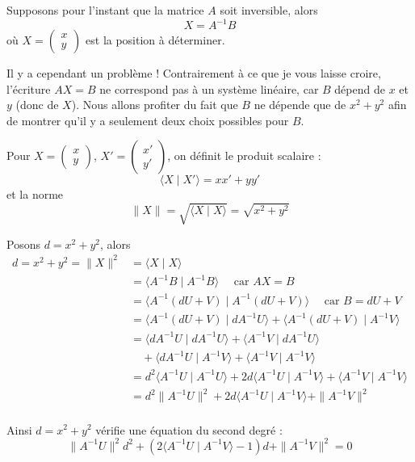 \documentclass[class=report,crop=false]{standalone}
\begin{document}
Supposons pour l'instant que la matrice $A$ soit inversible, 
alors 
$$X = A^{-1} B$$
où $X = \begin{pmatrix}x\\y\end{pmatrix}$ est la position à déterminer.

Il y a cependant un problème ! Contrairement à ce que je vous laisse croire,
l'écriture $AX=B$ ne correspond pas à un système linéaire, car
$B$ dépend de $x$ et $y$ (donc de $X$). Nous allons profiter du fait que $B$ ne dépende que de 
$x^2+y^2$ afin de montrer qu'il y a seulement deux choix possibles pour $B$.

Pour $X = \begin{pmatrix}x\\y\end{pmatrix}$, 
$X' = \begin{pmatrix}x'\\y'\end{pmatrix}$, 
on définit le produit scalaire :
$$\langle X \mid X' \rangle =  xx'+yy'$$
et la norme
$$\| X \| = \sqrt{\langle X \mid X \rangle} = \sqrt{x^2+y^2}$$

Posons $d = x^2+y^2$, alors
\begin{align*}
 d = x^2+y^2 = \| X \|^2 
 &= \langle  X \mid X \rangle \\
 &= \langle  A^{-1} B \mid A^{-1} B \rangle \quad \text{ car } AX=B \\
 &= \langle  A^{-1} ( dU+V)\mid A^{-1}( dU+V)\rangle \quad \text{ car } B = dU+V \\  
 &= \langle  A^{-1} ( dU+V)\mid dA^{-1} U\rangle
 + \langle  A^{-1} ( dU+V)\mid A^{-1} V \rangle \\
 &= \langle  dA^{-1} U\mid dA^{-1} U\rangle
 + \langle A^{-1} V\mid dA^{-1} U\rangle \\
 &\quad + \langle  dA^{-1}  U \mid A^{-1} V \rangle
 + \langle  A^{-1} V\mid A^{-1} V \rangle \\ 
 &= d^2 \langle  A^{-1} U\mid A^{-1} U\rangle
 + 2d\langle  A^{-1}  U \mid A^{-1} V \rangle
 +  \langle  A^{-1} V\mid A^{-1} V \rangle \\ 
 &= d^2 \|  A^{-1}  U  \|^2 + 2d\langle  A^{-1}  U \mid A^{-1} V \rangle
 +\| A^{-1} V \|^2 \\
 \end{align*}

Ainsi $d=x^2+y^2$ vérifie une équation du second degré :
\begin{equation}
\label{eq :gpsseconddegre}
\|  A^{-1}  U  \|^2 d^2 
+ \left(2\langle  A^{-1}  U \mid A^{-1} V \rangle - 1\right) d  +\| A^{-1} V \|^2 = 0  
\end{equation}
\end{document}
